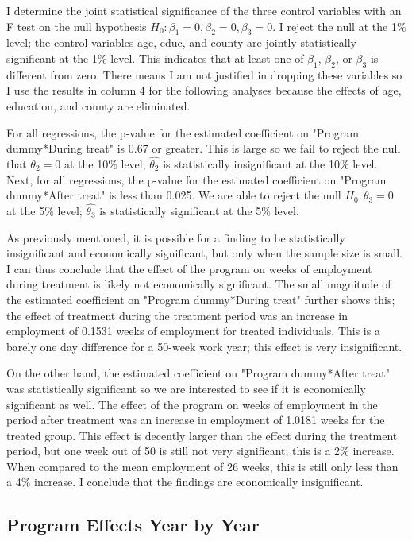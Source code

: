 \documentclass[a4paper]{article}
\begin{document}
I determine the joint statistical significance of the three control variables with an F test on the null hypothesis $H_{0}: \beta_{1} = 0, \beta_{2} = 0, \beta_{3} = 0$. I reject the null at the 1$\%$ level; the control variables age, educ, and county are jointly statistically significant at the 1$\%$ level. This indicates that at least one of $\beta_{1}$, $\beta_{2}$, or $\beta_{3}$ is different from zero. There means I am not justified in dropping these variables so I use the results in column 4 for the following analyses because the effects of age, education, and county are eliminated.

For all regressions, the p-value for the estimated coefficient on "Program dummy*During treat" is 0.67 or greater. This is large so we fail to reject the null that $\theta_2 = 0$ at the 10$\%$ level; $\hat{\theta_2}$ is statistically insignificant at the 10$\%$ level. Next, for all regressions, the p-value for the estimated coefficient on  "Program dummy*After treat" is less than 0.025. We are able to reject the null $H_{0}: \theta_3 = 0$ at the 5$\%$ level; $\hat{\theta_3}$ is statistically significant at the 5$\%$ level.

As previously mentioned, it is possible for a finding to be statistically insignificant and economically significant, but only when the sample size is small. I can thus conclude that the effect of the program on weeks of employment during treatment is likely not economically significant. The small magnitude of the estimated coefficient on "Program dummy*During treat" further shows this; the effect of treatment during the treatment period was an increase in employment of 0.1531 weeks of employment for treated individuals. This is a barely one day difference for a 50-week work year; this effect is very insignificant. 

On the other hand, the estimated coefficient on "Program dummy*After treat" was statistically significant so we are interested to see if it is economically significant as well. The effect of the program on weeks of employment in the period after treatment was an increase in employment of 1.0181 weeks for the treated group. This effect is decently larger than the effect during the treatment period, but one week out of 50 is still not very significant; this is a 2$\%$ increase. When compared to the mean employment of 26 weeks, this is still only less than a 4$\%$ increase. I conclude that the findings are economically insignificant.

\subsection{Program Effects Year by Year}
\end{document}
